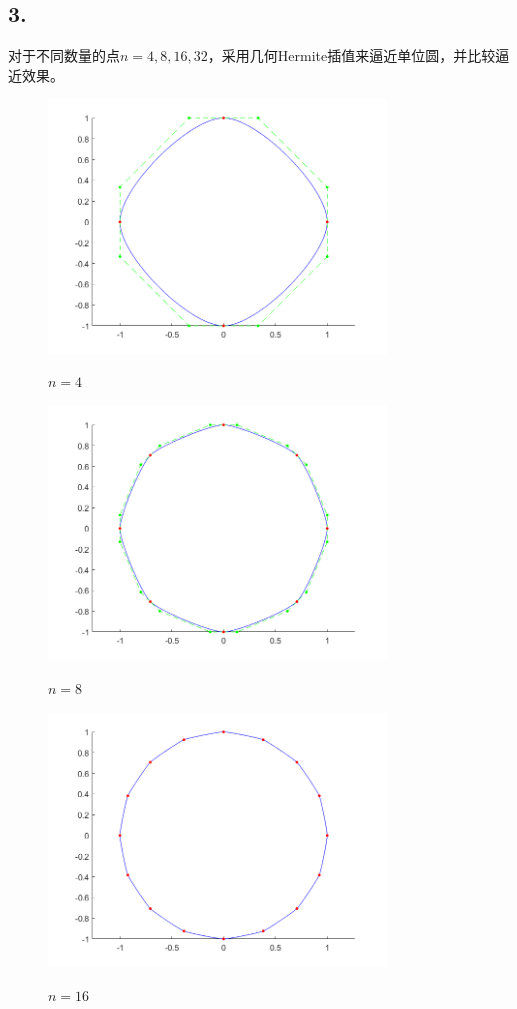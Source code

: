 \documentclass[utf8]{ctexart}
\begin{document}
\subsection*{3.}
对于不同数量的点$n=4,8,16,32$，采用几何Hermite插值来逼近单位圆，并比较逼近效果。
\begin{figure}[H]
    \centering
    \includegraphics[width=0.8\textwidth]{geomHermite_n4.png}
    \label{fig9}
    \caption{$n=4$}
\end{figure}
\begin{figure}[H]
    \centering
    \includegraphics[width=0.8\textwidth]{geomHermite_n8.png}
    \label{fig10}
    \caption{$n=8$}
\end{figure}
\begin{figure}[H]
    \centering
    \includegraphics[width=0.8\textwidth]{geomHermite_n16.png}
    \label{fig11}
    \caption{$n=16$}
\end{figure}
\end{document}
